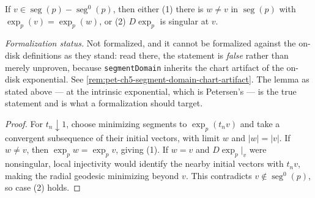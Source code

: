 \begin{lemma}
  \label{lem:pet-ch5-cut-locus-characterization}


  If $v\in\operatorname{seg}(p)-\operatorname{seg}^0(p)$, then either (1) there is
  $w\ne v$ in $\operatorname{seg}(p)$ with $\exp_p(v)=\exp_p(w)$, or (2) $D\exp_p$
  is singular at $v$.

  \emph{Formalization status.} Not formalized, and it cannot be formalized against
  the on-disk definitions as they stand: read there, the statement is \emph{false}
  rather than merely unproven, because \texttt{segmentDomain} inherits the chart
  artifact of the on-disk exponential. See
  \cref{rem:pet-ch5-segment-domain-chart-artifact}. The lemma as stated above — at
  the intrinsic exponential, which is Petersen's — is the true statement and is what
  a formalization should target.
\end{lemma}
\begin{proof}
  \sketch
  For $t_n\downarrow1$, choose minimizing segments to $\exp_p(t_nv)$ and take a
  convergent subsequence of their initial vectors, with limit $w$ and $|w|=|v|$.
  If $w\ne v$, then $\exp_pw=\exp_pv$, giving (1).  If $w=v$ and $D\exp_p|_v$ were
  nonsingular, local injectivity would identify the nearby initial vectors with
  $t_nv$, making the radial geodesic minimizing beyond $v$.  This contradicts
  $v\notin\operatorname{seg}^0(p)$, so case (2) holds.
\end{proof}

